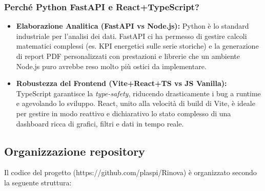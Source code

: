 \subsubsection*{Perché Python FastAPI e React+TypeScript?}
\begin{itemize}
    \item \textbf{Elaborazione Analitica (FastAPI vs Node.js):} Python è lo standard industriale per l'analisi dei dati. FastAPI ci ha permesso di gestire calcoli matematici complessi (es. KPI energetici sulle serie storiche) e la generazione di report PDF personalizzati con prestazioni e librerie che un ambiente Node.js puro avrebbe reso molto più ostici da implementare.
    \item \textbf{Robustezza del Frontend (Vite+React+TS vs JS Vanilla):} TypeScript garantisce la \textit{type-safety}, riducendo drasticamente i bug a runtime e agevolando lo sviluppo. React, unito alla velocità di build di Vite, è ideale per gestire in modo reattivo e dichiarativo lo stato complesso di una dashboard ricca di grafici, filtri e dati in tempo reale.
\end{itemize}


\subsection{Organizzazione repository}
Il codice del progetto (https://github.com/plaspi/Rinova) è organizzato secondo la seguente struttura:

